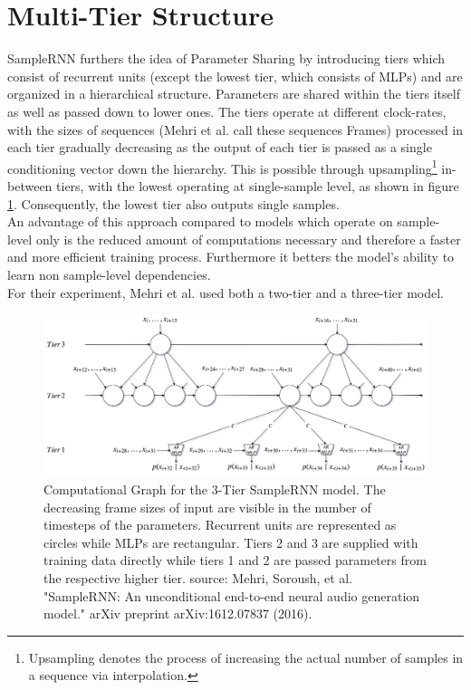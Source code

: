 \documentclass[a4paper, 11pt]{report}
\begin{document}
\section{Multi-Tier Structure}
SampleRNN furthers the idea of Parameter Sharing by introducing tiers which 
consist of recurrent units (except the lowest tier, which consists of MLPs) and 
are organized in a hierarchical structure. Parameters are shared within the 
tiers itself as well as passed down to lower ones. The tiers operate at different 
clock-rates, with the sizes of sequences (Mehri et al. call these sequences Frames) 
processed in each tier gradually decreasing as the output of each tier is passed 
as a single conditioning vector down the hierarchy. This is possible through 
upsampling\footnote{Upsampling denotes the process of increasing the actual number of 
samples in a sequence via interpolation. 
}
in-between tiers, with the lowest operating at single-sample level, 
as shown in figure \ref{fig2:samplernn}. Consequently, the lowest tier also 
outputs single samples. \\
An advantage of this approach compared to models which operate on sample-level 
only is the reduced amount of computations necessary and therefore a faster and 
more efficient training process. Furthermore it betters the model’s ability to 
learn non sample-level dependencies. \\
For their experiment, Mehri et al. used both a two-tier and a three-tier model.
\begin{figure}[h!]
    \includegraphics[width=\linewidth]{samplernn.png}
    \caption{Computational Graph for the 3-Tier SampleRNN model. The decreasing 
    frame sizes of input are visible in the number of timesteps of the parameters. 
    Recurrent units are represented as circles while MLPs are rectangular. Tiers 
    2 and 3 are supplied with training data directly while tiers 1 and 2 are 
    passed parameters from the respective higher tier.
    source: Mehri, Soroush, et al. "SampleRNN: An unconditional end-to-end 
    neural audio generation model." arXiv preprint arXiv:1612.07837 (2016).
    }
    \label{fig2:samplernn}
\end{figure}
\end{document}
